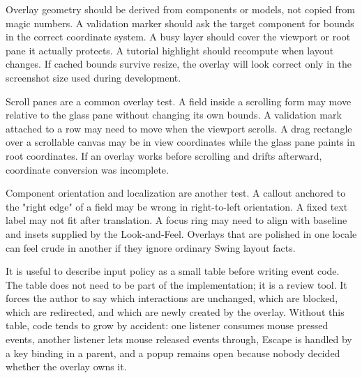 Overlay geometry should be derived from components or models, not copied from magic numbers. A validation marker should ask the target component for bounds in the correct coordinate system. A busy layer should cover the viewport or root pane it actually protects. A tutorial highlight should recompute when layout changes. If cached bounds survive resize, the overlay will look correct only in the screenshot size used during development.

Scroll panes are a common overlay test. A field inside a scrolling form may move relative to the glass pane without changing its own bounds. A validation mark attached to a row may need to move when the viewport scrolls. A drag rectangle over a scrollable canvas may be in view coordinates while the glass pane paints in root coordinates. If an overlay works before scrolling and drifts afterward, coordinate conversion was incomplete.

Component orientation and localization are another test. A callout anchored to the "right edge" of a field may be wrong in right-to-left orientation. A fixed text label may not fit after translation. A focus ring may need to align with baseline and insets supplied by the Look-and-Feel. Overlays that are polished in one locale can feel crude in another if they ignore ordinary Swing layout facts.

It is useful to describe input policy as a small table before writing event
code. The table does not need to be part of the implementation; it is a review
tool. It forces the author to say which interactions are unchanged, which are
blocked, which are redirected, and which are newly created by the overlay.
Without this table, code tends to grow by accident: one listener consumes mouse
pressed events, another listener lets mouse released events through, Escape is
handled by a key binding in a parent, and a popup remains open because nobody
decided whether the overlay owns it.


